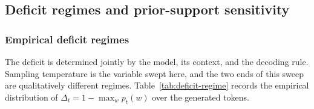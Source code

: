 \documentclass[11pt]{article}
\begin{document}
\FloatBarrier
\subsection{Deficit regimes and prior-support sensitivity}
\label{sec:deficit-support-analysis}

\subsubsection{Empirical deficit regimes}
\label{sec:deficit-regime}

The deficit is determined jointly by the model, its context, and the decoding
rule.  Sampling temperature is the variable swept here, and the two ends of
this sweep are qualitatively different regimes.
Table~\ref{tab:deficit-regime} records the empirical distribution of
$\Delta_t=1-\max_w p_t(w)$ over the generated tokens.
\end{document}
